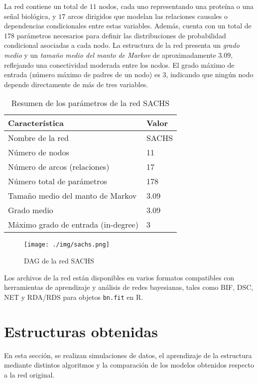 \documentclass[12pt,letterpaper]{article}
\begin{document}
La red contiene un total de $11$ nodos, cada uno representando una proteína o una señal biológica, y $17$ arcos dirigidos que modelan las relaciones causales o dependencias condicionales entre estas variables. Además, cuenta con un total de $178$ parámetros necesarios para definir las distribuciones de probabilidad condicional asociadas a cada nodo. La estructura de la red presenta un \textit{grado medio} y un \textit{tamaño medio del manto de Markov} de aproximadamente $3.09$, reflejando una conectividad moderada entre los nodos. El grado máximo de entrada (número máximo de padres de un nodo) es $3$, indicando que ningún nodo depende directamente de más de tres variables.

\begin{table}[htp]
    \centering
    \caption{Resumen de los parámetros de la red SACHS}
    \vspace{0.3cm}
    \begin{tabular}{@{}ll@{}}
        \toprule
        \textbf{Característica}             & \textbf{Valor} \\ \midrule
        Nombre de la red                    & SACHS          \\
        Número de nodos                     & 11             \\
        Número de arcos (relaciones)        & 17             \\
        Número total de parámetros          & 178            \\
        Tamaño medio del manto de Markov    & 3.09           \\
        Grado medio                         & 3.09           \\
        Máximo grado de entrada (in-degree) & 3              \\
        \bottomrule
    \end{tabular}
    \label{tabla:sachs_parametros}
\end{table}

\begin{figure}[htp]
    \centering
    \texttt{[image: ./img/sachs.png]}
    \caption{DAG de la red SACHS}
    \label{fig:sachs}
\end{figure}

Los archivos de la red están disponibles en varios formatos compatibles con herramientas de aprendizaje y análisis de redes bayesianas, tales como BIF, DSC, NET y RDA/RDS para objetos \texttt{bn.fit} en R.

\section{Estructuras obtenidas}
En esta sección, se realizan simulaciones de datos, el aprendizaje de la estructura mediante distintos algoritmos y la comparación de los modelos obtenidos respecto a la red original.
\end{document}

